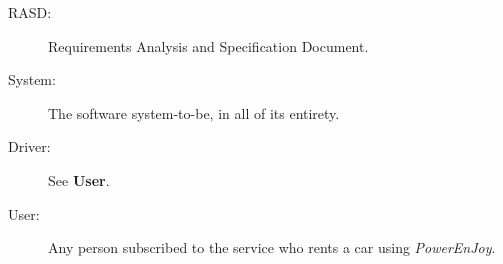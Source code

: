 \begin{description}
\item[RASD:] Requirements Analysis and Specification Document.
\item[System:] The software system-to-be, in all of its entirety.
\item[Driver:] See \textbf{User}.
\item[User:] Any person subscribed to the service who rents a car using \hbox{\emph{PowerEnJoy}}.
\end{description}


